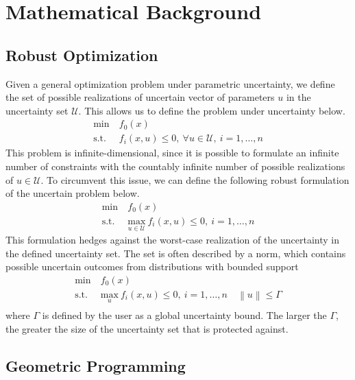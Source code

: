 \section{Mathematical Background}

\subsection{Robust Optimization}

Given a general optimization problem under parametric uncertainty, we define the set of possible
realizations of uncertain vector of parameters $u$ in the uncertainty set $\mathcal{U}$. This
allows us to define the problem under uncertainty below.
\begin{align*}
    \text{min} &~f_0(x) \\
    \text{s.t.}     &~f_i(x,u) \leq 0,~\forall u \in \mathcal{U},~i = 1,\ldots,n
\end{align*}
This problem is infinite-dimensional, since it is possible to formulate an infinite number of constraints
with the countably infinite number of possible realizations of $u \in \mathcal{U}$. To circumvent this issue,
we can define the following robust formulation of the uncertain problem below.
\begin{align*}
    \text{min} &~f_0(x) \\
    \text{s.t.}     &~\underset{u \in \mathcal{U}}{\text{max}}~f_i(x,u) \leq 0,~i = 1,\ldots,n
\end{align*}
This formulation hedges against the worst-case realization of the uncertainty in the defined uncertainty
set. The set is often described by a norm, which contains possible uncertain outcomes from distributions with
bounded support
\begin{equation}
\begin{aligned}
    \text{min} &~f_0(x) \\
    \text{s.t.}     &~\underset{u}{\text{max}}~f_i(x,u) \leq 0,~i = 1,\ldots,n
                    &~\left\lVert u \right\rVert \leq \Gamma \\
\end{aligned}
        \label{eq:normform}
\end{equation}
where $\Gamma$ is defined by the user as a global uncertainty bound. The larger the $\Gamma$,
the greater the size of the uncertainty set that is protected against.

\subsection{Geometric Programming}

